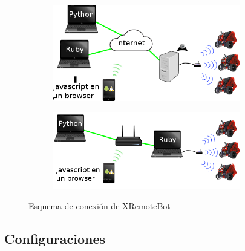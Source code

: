 \begin{figure}
    \begin{subfigure}[b]{0.48\textwidth}
        \centering
        \includegraphics[width=0.9\textwidth]{figures/arquitectura_propuesta_wan}
        \label{fig:esquema_xremotebot_wan}
    \end{subfigure}%
    \begin{subfigure}[b]{0.48\textwidth}
        \centering
        \includegraphics[width=0.9\textwidth]{figures/arquitectura_propuesta}
        \label{fig:esquema_xremotebot_lan}
    \end{subfigure}
    \caption{Esquema de conexión de XRemoteBot}\label{fig:esquema_xremotebot}
\end{figure}



\subsection{Configuraciones}\label{sec:configuraciones}

